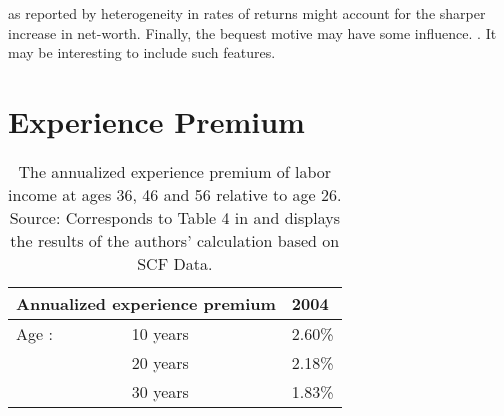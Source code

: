 \documentclass[a4paper,12pt,legno]{article}
\begin{document}
as reported by \cite{benhabib2011distribution} heterogeneity in rates of returns might account for the sharper increase in net-worth. Finally, the bequest motive may have some influence. \cite{denardi2014}. It may be interesting to include such features. 

\label{Chapter6}


\newpage





\newpage


\appendix
\section{Experience Premium}
 \label{table_experience_premium}  


\begin{table}[!htbp]
\centering
\begin{threeparttable}
\setlength{\tabcolsep}{6em}
\caption[The annualized experience premium of labor income at ages 36, 46 and 56 relative to age 26.Source: Corresponds to Table 4 in \cite{hintermaier2011} and is based on the authors' calculation based on SCF Data.]{The annualized experience premium of labor income at ages 36, 46 and 56 relative to age 26.\\\hspace{\textwidth} Source: Corresponds to Table 4 in \cite{hintermaier2011} and displays the results of the authors' calculation based on SCF Data.}
\label{my-label}
\begin{tabular}{@{}lll@{}}
\toprule
\multicolumn{2}{l}{Annualized experience premium}   & 2004   \\ \midrule
Age \textendash  26:& 10 years                & 2.60\% \\
                         & 20 years               & 2.18\% \\
                         & 30 years                & 1.83\% \\ \bottomrule
\end{tabular}
\end{threeparttable}
\end{table}
\end{document}
